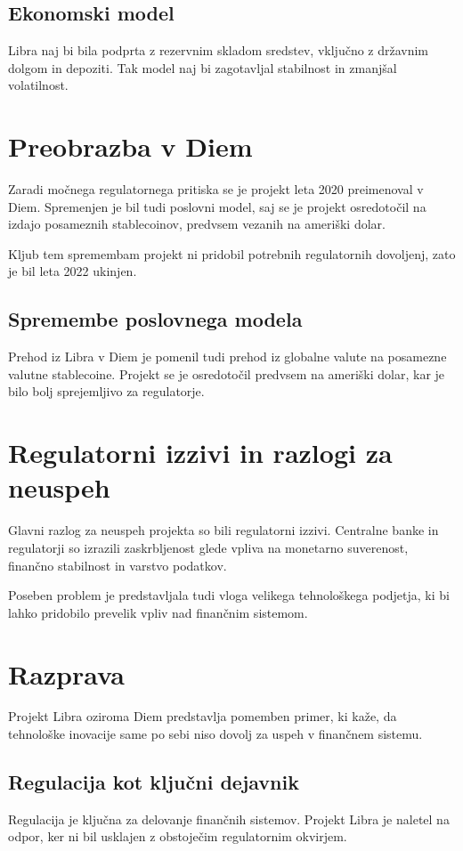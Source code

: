 \documentclass[12pt,a4paper]{article}
\begin{document}
\subsection{Ekonomski model}
Libra naj bi bila podprta z rezervnim skladom sredstev, vključno z državnim dolgom in depoziti. Tak model naj bi zagotavljal stabilnost in zmanjšal volatilnost.

\section{Preobrazba v Diem}

Zaradi močnega regulatornega pritiska se je projekt leta 2020 preimenoval v Diem. Spremenjen je bil tudi poslovni model, saj se je projekt osredotočil na izdajo posameznih stablecoinov, predvsem vezanih na ameriški dolar.

Kljub tem spremembam projekt ni pridobil potrebnih regulatornih dovoljenj, zato je bil leta 2022 ukinjen.

\subsection{Spremembe poslovnega modela}
Prehod iz Libra v Diem je pomenil tudi prehod iz globalne valute na posamezne valutne stablecoine. Projekt se je osredotočil predvsem na ameriški dolar, kar je bilo bolj sprejemljivo za regulatorje.

\section{Regulatorni izzivi in razlogi za neuspeh}

Glavni razlog za neuspeh projekta so bili regulatorni izzivi. Centralne banke in regulatorji so izrazili zaskrbljenost glede vpliva na monetarno suverenost, finančno stabilnost in varstvo podatkov.

Poseben problem je predstavljala tudi vloga velikega tehnološkega podjetja, ki bi lahko pridobilo prevelik vpliv nad finančnim sistemom.

\section{Razprava}

Projekt Libra oziroma Diem predstavlja pomemben primer, ki kaže, da tehnološke inovacije same po sebi niso dovolj za uspeh v finančnem sistemu.

\subsection{Regulacija kot ključni dejavnik}
Regulacija je ključna za delovanje finančnih sistemov. Projekt Libra je naletel na odpor, ker ni bil usklajen z obstoječim regulatornim okvirjem.
\end{document}
